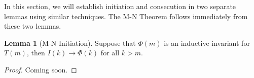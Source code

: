 \documentclass[12pt]{article}
\theoremstyle{definition}
\newtheorem{lemma}{Lemma}
\theoremstyle{remark}
\newcommand{\msp}{\text{ }}
\newcommand{\states}{\text{States}}
\newcommand{\perm}{\genfrac{}{}{0pt}{}}
\begin{document}
In this section, we will establish initiation and consecution in two separate lemmas using similar techniques.  The M-N Theorem follows immediately from these two lemmas.

\begin{lemma}[M-N Initiation]
  Suppose that $\Phi(m)$ is an inductive invariant for $T(m)$, then $I(k) \rightarrow \Phi(k)$ for all $k>m$.
\end{lemma}
\begin{proof}
  Coming soon.


\end{proof}
\end{document}
